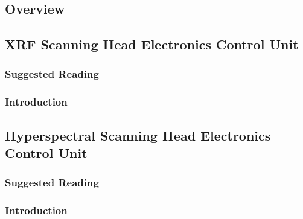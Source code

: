 \subsection{Overview}





\subsection{XRF Scanning Head Electronics Control Unit}

\subsubsection{Suggested Reading}

\subsubsection{Introduction}






\subsection{Hyperspectral Scanning Head Electronics Control Unit}

\subsubsection{Suggested Reading}

\subsubsection{Introduction}

